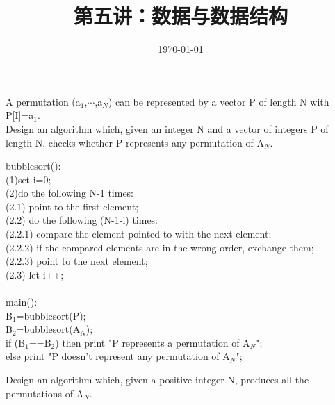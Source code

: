 \documentclass[11pt, a4paper, UTF8]{ctexart}
\title{第五讲：数据与数据结构}
\date{\today}     %
\begin{document}
\maketitle
\noplagiarism	%
\beginthishw	%

\begin{problem}[DH:2.10]
A permutation (a$_1$,$\cdots$,a$_N$) can be represented by a vector P of length N with P[I]=a$_1$. \\
Design an algorithm which, given an integer N and a vector of integers P of length N, checks whether P represents any permutation of A$_N$.
\end{problem}

\begin{solution}
bubblesort():\\
(1)set i=0;\\
(2)do the following N-1 times:\\
\indent \noindent(2.1) point to the first element;\\
\indent \noindent(2.2) do the following (N-1-i) times:\\
\indent \noindent \indent \noindent(2.2.1) compare the element pointed to with the next element;\\
\indent \noindent \indent \noindent(2.2.2) if the compared elements are in the wrong order, exchange them;\\
\indent \noindent \indent \noindent(2.2.3) point to the next element;\\
(2.3) let i++;\\
\\
main():\\
B$_1$=bubblesort(P);\\
B$_2$=bubblesort(A$_N$);\\
if (B$_1$==B$_2$) then print "P represents a permutation of A$_N$";\\
else print "P doesn't represent any permutation of A$_N$";\\
\end{solution}


\begin{problem}[DH:2.11]
Design an algorithm which, given a positive integer N, produces all the permutations of A$_N$.\\
\end{problem}
\end{document}
